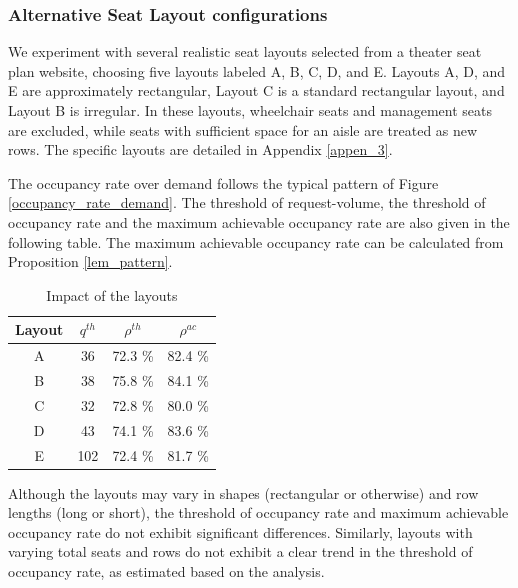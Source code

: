 \subsubsection{Alternative Seat Layout configurations}
We experiment with several realistic seat layouts selected from a theater seat plan website, choosing five layouts labeled A, B, C, D, and E. Layouts A, D, and E are approximately rectangular, Layout C is a standard rectangular layout, and Layout B is irregular. In these layouts, wheelchair seats and management seats are excluded, while seats with sufficient space for an aisle are treated as new rows. The specific layouts are detailed in Appendix \ref{appen_3}.

The occupancy rate over demand follows the typical pattern of Figure \ref{occupancy_rate_demand}. The threshold of request-volume, the threshold of occupancy rate and the maximum achievable occupancy rate are also given in the following table. The maximum achievable occupancy rate can be calculated from Proposition \ref{lem_pattern}.

\begin{table}[ht]
  \centering
  \caption{Impact of the layouts}
  \begin{tabular}{cccc}
  \hline
   Layout & $q^{th}$ & $\rho^{th}$ & $\rho^{ac}$ \\
  \hline
   A & 36 & 72.3 \% & 82.4 \% \\
   B & 38 & 75.8 \% & 84.1 \% \\
   C & 32 & 72.8 \% & 80.0 \% \\
   D & 43 & 74.1 \%  & 83.6 \% \\
   E & 102 & 72.4 \% & 81.7 \% \\
   \hline
  \end{tabular}
\end{table}

Although the layouts may vary in shapes (rectangular or otherwise) and row lengths (long or short), the threshold of occupancy rate and maximum achievable occupancy rate do not exhibit significant differences. Similarly, layouts with varying total seats and rows do not exhibit a clear trend in the threshold of occupancy rate, as estimated based on the analysis.